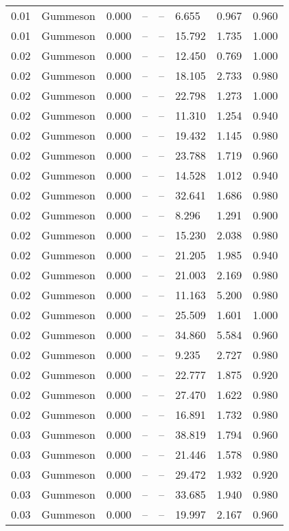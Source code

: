 \begin{table}[H]
\begin{tabular}{l c l l l}
0.01 & Gummeson & 0.000 & -- & -- & 6.655 & 0.967 & 0.960 \\
0.01 & Gummeson & 0.000 & -- & -- & 15.792 & 1.735 & 1.000 \\
0.02 & Gummeson & 0.000 & -- & -- & 12.450 & 0.769 & 1.000 \\
0.02 & Gummeson & 0.000 & -- & -- & 18.105 & 2.733 & 0.980 \\
0.02 & Gummeson & 0.000 & -- & -- & 22.798 & 1.273 & 1.000 \\
0.02 & Gummeson & 0.000 & -- & -- & 11.310 & 1.254 & 0.940 \\
0.02 & Gummeson & 0.000 & -- & -- & 19.432 & 1.145 & 0.980 \\
0.02 & Gummeson & 0.000 & -- & -- & 23.788 & 1.719 & 0.960 \\
0.02 & Gummeson & 0.000 & -- & -- & 14.528 & 1.012 & 0.940 \\
0.02 & Gummeson & 0.000 & -- & -- & 32.641 & 1.686 & 0.980 \\
0.02 & Gummeson & 0.000 & -- & -- & 8.296 & 1.291 & 0.900 \\
0.02 & Gummeson & 0.000 & -- & -- & 15.230 & 2.038 & 0.980 \\
0.02 & Gummeson & 0.000 & -- & -- & 21.205 & 1.985 & 0.940 \\
0.02 & Gummeson & 0.000 & -- & -- & 21.003 & 2.169 & 0.980 \\
0.02 & Gummeson & 0.000 & -- & -- & 11.163 & 5.200 & 0.980 \\
0.02 & Gummeson & 0.000 & -- & -- & 25.509 & 1.601 & 1.000 \\
0.02 & Gummeson & 0.000 & -- & -- & 34.860 & 5.584 & 0.960 \\
0.02 & Gummeson & 0.000 & -- & -- & 9.235 & 2.727 & 0.980 \\
0.02 & Gummeson & 0.000 & -- & -- & 22.777 & 1.875 & 0.920 \\
0.02 & Gummeson & 0.000 & -- & -- & 27.470 & 1.622 & 0.980 \\
0.02 & Gummeson & 0.000 & -- & -- & 16.891 & 1.732 & 0.980 \\
0.03 & Gummeson & 0.000 & -- & -- & 38.819 & 1.794 & 0.960 \\
0.03 & Gummeson & 0.000 & -- & -- & 21.446 & 1.578 & 0.980 \\
0.03 & Gummeson & 0.000 & -- & -- & 29.472 & 1.932 & 0.920 \\
0.03 & Gummeson & 0.000 & -- & -- & 33.685 & 1.940 & 0.980 \\
0.03 & Gummeson & 0.000 & -- & -- & 19.997 & 2.167 & 0.960 \\

\end{tabular}
\end{table}
